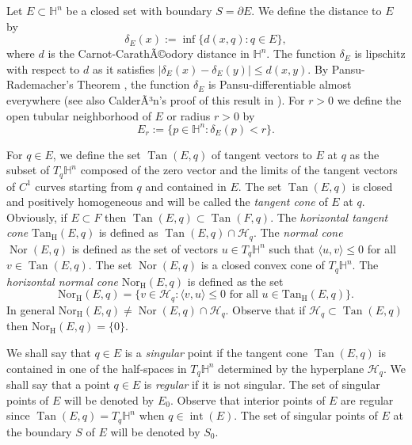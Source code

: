 \documentclass[10pt]{amsart}
\theoremstyle{definition}
\theoremstyle{remark}
\numberwithin{equation}{section}
\begin{document}
Let $E\subset{{\mathbb{H}}}^n$ be a closed set with boundary $S={\partial} E$. We define the distance to $E$ by
\begin{equation}
\label{eq:da}
{\delta_{E}}(x):=\inf\{d(x,q) : q\in E\},
\end{equation}
where $d$ is the Carnot-CarathÃ©odory distance in ${{\mathbb{H}}}^n$. The function ${\delta_{E}}$ is lipschitz with respect to $d$ as it satisfies $|{\delta_{E}}(x)-{\delta_{E}}(y)|{\leqslant} d(x,y)$.  By Pansu-Rademacher's Theorem \cite{MR979599}, the function ${\delta_{E}}$ is Pansu-differentiable almost everywhere (see also CalderÃ³n's proof of this result in \cite[Thm.~6.13]{MR2312336}). For $r>0$ we define the open tubular neighborhood of $E$ or radius $r>0$ by
\[
E_{r}:=\{p\in{{\mathbb{H}}}^n : {\delta_{E}}(p)<r\}.
\]

For $q\in E$, we define the set $\operatorname{Tan}(E,q)$ of tangent vectors to $E$ at $q$ as the subset of $T_{q}{{\mathbb{H}}}^n$ composed of the zero vector and the limits of the tangent vectors of $C^1$ curves starting from $q$ and contained in $E$. The set $\operatorname{Tan}(E,q)$ is closed and positively homogeneous and will be called the \emph{tangent cone} of $E$ at $q$. Obviously, if $E\subset F$ then $\operatorname{Tan}(E,q)\subset\operatorname{Tan}(F,q)$. The \emph{horizontal tangent cone} $\operatorname{Tan_{H}}(E,q)$ is defined as $\operatorname{Tan}(E,q)\cap\mathcal{H}_{q}$. The \emph{normal cone} $\operatorname{Nor}(E,q)$ is defined as the set of  vectors $u\in T_q{{\mathbb{H}}}^n$ such that ${\langle{u,v}\rangle}{\leqslant} 0$ for all $v\in\operatorname{Tan}(E,q)$. The set $\operatorname{Nor}(E,q)$ is a closed convex cone of $T_{q}{{\mathbb{H}}}^n$. The \emph{horizontal normal cone} $\operatorname{Nor_{H}}(E,q)$ is defined as the set
\[
\operatorname{Nor_{H}}(E,q)=\{v\in {\mathcal{H}}_q: {\langle{v,u}\rangle}{\leqslant} 0 \text{ for all }u\in\operatorname{Tan_{H}}(E,q)\}.
\]
In general $\operatorname{Nor_{H}}(E,q)\neq\operatorname{Nor}(E,q)\cap{\mathcal{H}}_q$. Observe that if ${\mathcal{H}}_q\subset\operatorname{Tan}(E,q)$ then $\operatorname{Nor_{H}}(E,q)=\{0\}$.

We shall say that $q\in E$ is a \emph{singular} point if the tangent cone $\operatorname{Tan}(E,q)$ is contained in one of the half-spaces in $T_q{{\mathbb{H}}}^n$ determined by the hyperplane ${\mathcal{H}}_q$. We shall say that a point $q\in E$ is \emph{regular} if it is not singular. The set of singular points of $E$ will be denoted by $E_0$. Observe that interior points of $E$ are regular since $\operatorname{Tan}(E,q)=T_q{{\mathbb{H}}}^n$ when $q\in\operatorname{int}(E)$. The set of singular points of $E$ at the boundary $S$ of $E$ will be denoted by $S_0$.
\end{document}
